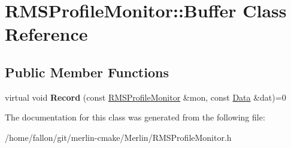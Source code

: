 \hypertarget{classRMSProfileMonitor_1_1Buffer}{}\section{R\+M\+S\+Profile\+Monitor\+:\+:Buffer Class Reference}
\label{classRMSProfileMonitor_1_1Buffer}
\subsection*{Public Member Functions}
\begin{DoxyCompactItemize}
\item 
\mbox{\label{classRMSProfileMonitor_1_1Buffer_ae5da389cea296ad7a2919f2e7b4c90a5}} 
virtual void {\bfseries Record} (const \hyperlink{classRMSProfileMonitor}{R\+M\+S\+Profile\+Monitor} \&mon, const \hyperlink{structRMSProfileMonitor_1_1Data}{Data} \&dat)=0
\end{DoxyCompactItemize}


The documentation for this class was generated from the following file\+:\begin{DoxyCompactItemize}
\item 
/home/fallon/git/merlin-\/cmake/\+Merlin/R\+M\+S\+Profile\+Monitor.\+h\end{DoxyCompactItemize}
